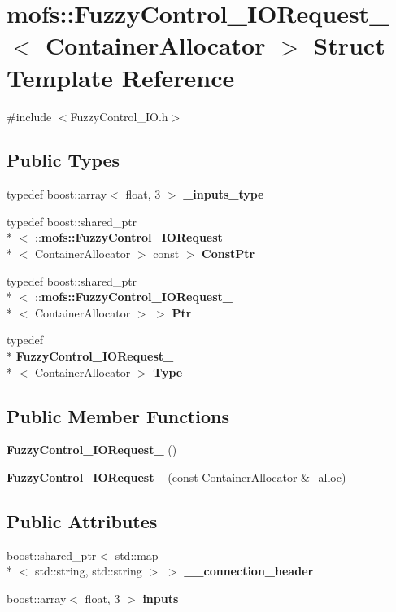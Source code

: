 \section{mofs\-:\-:Fuzzy\-Control\-\_\-\-I\-O\-Request\-\_\-$<$ Container\-Allocator $>$ Struct Template Reference}
\label{structmofs_1_1FuzzyControl__IORequest__}


{\ttfamily \#include $<$Fuzzy\-Control\-\_\-\-I\-O.\-h$>$}

\subsection*{Public Types}
\begin{DoxyCompactItemize}
\item 
typedef boost\-::array$<$ float, 3 $>$ {\bf \-\_\-inputs\-\_\-type}
\item 
typedef boost\-::shared\-\_\-ptr\\*
$<$ \-::{\bf mofs\-::\-Fuzzy\-Control\-\_\-\-I\-O\-Request\-\_\-}\\*
$<$ Container\-Allocator $>$ const  $>$ {\bf Const\-Ptr}
\item 
typedef boost\-::shared\-\_\-ptr\\*
$<$ \-::{\bf mofs\-::\-Fuzzy\-Control\-\_\-\-I\-O\-Request\-\_\-}\\*
$<$ Container\-Allocator $>$ $>$ {\bf Ptr}
\item 
typedef \\*
{\bf Fuzzy\-Control\-\_\-\-I\-O\-Request\-\_\-}\\*
$<$ Container\-Allocator $>$ {\bf Type}
\end{DoxyCompactItemize}
\subsection*{Public Member Functions}
\begin{DoxyCompactItemize}
\item 
{\bf Fuzzy\-Control\-\_\-\-I\-O\-Request\-\_\-} ()
\item 
{\bf Fuzzy\-Control\-\_\-\-I\-O\-Request\-\_\-} (const Container\-Allocator \&\-\_\-alloc)
\end{DoxyCompactItemize}
\subsection*{Public Attributes}
\begin{DoxyCompactItemize}
\item 
boost\-::shared\-\_\-ptr$<$ std\-::map\\*
$<$ std\-::string, std\-::string $>$ $>$ {\bf \-\_\-\-\_\-connection\-\_\-header}
\item 
boost\-::array$<$ float, 3 $>$ {\bf inputs}
\end{DoxyCompactItemize}


